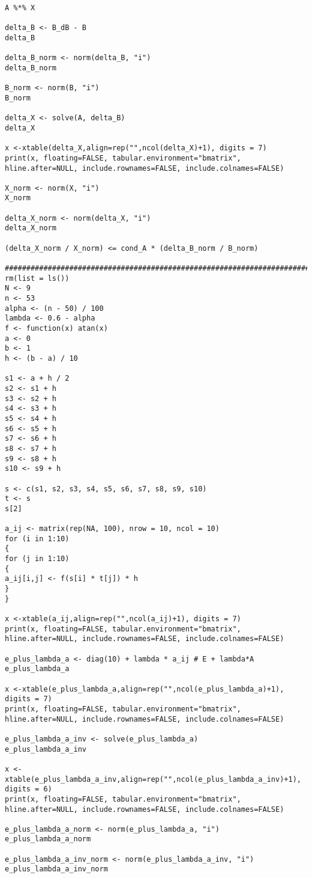 \documentclass[14pt,a4paper]{scrartcl}
\begin{document}
\begin{lstlisting}
A %*% X

delta_B <- B_dB - B
delta_B

delta_B_norm <- norm(delta_B, "i")
delta_B_norm

B_norm <- norm(B, "i")
B_norm

delta_X <- solve(A, delta_B)
delta_X

x <-xtable(delta_X,align=rep("",ncol(delta_X)+1), digits = 7)
print(x, floating=FALSE, tabular.environment="bmatrix", 
hline.after=NULL, include.rownames=FALSE, include.colnames=FALSE)

X_norm <- norm(X, "i")
X_norm

delta_X_norm <- norm(delta_X, "i")
delta_X_norm

(delta_X_norm / X_norm) <= cond_A * (delta_B_norm / B_norm)

######################################################################################
rm(list = ls())
N <- 9
n <- 53
alpha <- (n - 50) / 100
lambda <- 0.6 - alpha
f <- function(x) atan(x)
a <- 0
b <- 1
h <- (b - a) / 10

s1 <- a + h / 2
s2 <- s1 + h
s3 <- s2 + h
s4 <- s3 + h
s5 <- s4 + h
s6 <- s5 + h
s7 <- s6 + h
s8 <- s7 + h
s9 <- s8 + h
s10 <- s9 + h

s <- c(s1, s2, s3, s4, s5, s6, s7, s8, s9, s10)
t <- s
s[2]

a_ij <- matrix(rep(NA, 100), nrow = 10, ncol = 10)
for (i in 1:10)
{
for (j in 1:10)
{
a_ij[i,j] <- f(s[i] * t[j]) * h
}
}

x <-xtable(a_ij,align=rep("",ncol(a_ij)+1), digits = 7)
print(x, floating=FALSE, tabular.environment="bmatrix", 
hline.after=NULL, include.rownames=FALSE, include.colnames=FALSE)

e_plus_lambda_a <- diag(10) + lambda * a_ij # E + lambda*A
e_plus_lambda_a

x <-xtable(e_plus_lambda_a,align=rep("",ncol(e_plus_lambda_a)+1), digits = 7)
print(x, floating=FALSE, tabular.environment="bmatrix", 
hline.after=NULL, include.rownames=FALSE, include.colnames=FALSE)

e_plus_lambda_a_inv <- solve(e_plus_lambda_a)
e_plus_lambda_a_inv

x <-xtable(e_plus_lambda_a_inv,align=rep("",ncol(e_plus_lambda_a_inv)+1), digits = 6)
print(x, floating=FALSE, tabular.environment="bmatrix", 
hline.after=NULL, include.rownames=FALSE, include.colnames=FALSE)

e_plus_lambda_a_norm <- norm(e_plus_lambda_a, "i")
e_plus_lambda_a_norm

e_plus_lambda_a_inv_norm <- norm(e_plus_lambda_a_inv, "i")
e_plus_lambda_a_inv_norm


\end{lstlisting}
\end{document}
